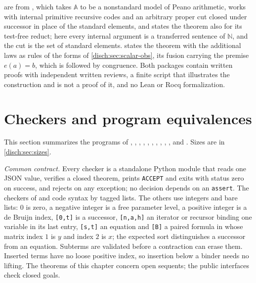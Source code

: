 \begin{remark}[Sources]
\label{disch:rem:sc-cov-sources}
are from , which takes $\mathbb A$ to be a
nonstandard model of Peano arithmetic, works with internal primitive
recursive codes and an arbitrary proper cut closed under successor in place
of the standard elements, and states the theorem also for its test-free
reduct; here every internal argument is a transferred sentence of
$\mathbb N$, and the cut is the set of standard elements.
 states the theorem with the additional laws as
rules of the forms of \cref{disch:sec:scalar-obs}, its fusion carrying the
premise $e(a)=b$, which is  followed by congruence. Both
packages contain written proofs with independent written reviews, a finite
script that illustrates the construction and is not a proof of it, and no
Lean or Rocq formalization.
\end{remark}

\section{Checkers and program equivalences}
\label{disch:sec:impl}

This section summarizes the programs of ,
, ,
, ,
, ,
, ,
,  and
. Sizes are in \cref{disch:sec:sizes}.

\emph{Common contract.} Every checker is a standalone Python module that
reads one JSON value, verifies a closed theorem, prints \texttt{ACCEPT}
and exits with status zero on success, and rejects on any exception; no
decision depends on an \texttt{assert}. The checkers of
 and  code
syntax by tagged lists. The others use integers and bare lists: $0$ is
zero, a negative integer is a free parameter level, a positive integer is
a de Bruijn index, \texttt{[0,t]} is a successor, \texttt{[n,a,h]} an
iterator or recursor binding one variable in its last entry,
\texttt{[s,t]} an equation and \texttt{[B]} a paired formula in whose
matrix index $1$ is $y$ and index $2$ is $x$; the expected sort
distinguishes a successor from an equation. Subterms are validated before
a contraction can erase them. Inserted terms have no loose positive index,
so insertion below a binder needs no lifting. The theorems of this chapter
concern open sequents; the public interfaces check closed goals.


